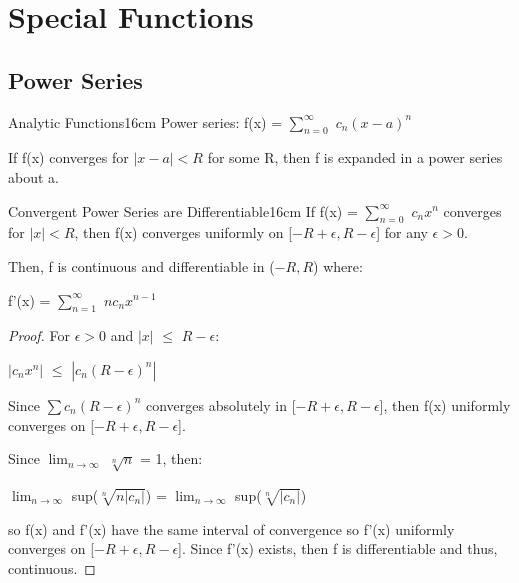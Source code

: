 \newpage

\section[Day 15: Special Functions]{ Special Functions }

\subsection{ Power Series }

    \begin{definition}{Analytic Functions}{16cm}
        Power series: f(x) = $\sum_{n=0}^{\infty}$ $c_n(x-a)^n$

        If f(x) converges for $|x-a| < R$
        for some R, then f is expanded in a power series about a.
    \end{definition}

    \vspace{0.5cm}



    \begin{wtheorem}{Convergent Power Series are Differentiable}{16cm}
        If f(x) = $\sum_{n=0}^{\infty}$ $c_nx^n$ converges for $|x| < R$, then
        f(x) converges uniformly on [$-R+\epsilon,R-\epsilon$] for any
        $\epsilon > 0$.

        Then, f is continuous and differentiable in ($-R,R$) where:

        \hspace{0.5cm}
        f'(x) = $\sum_{n=1}^{\infty}$ $nc_nx^{n-1}$
    \end{wtheorem}

    \begin{proof}
        For $\epsilon > 0$ and $|x|$ $\leq$ $R - \epsilon$:

        \hspace{0.5cm}
        $|c_nx^n|$ $\leq$ $|c_n(R-\epsilon)^n|$

        Since $\sum c_n(R-\epsilon)^n$ converges absolutely in
        [$-R+\epsilon,R-\epsilon$], then f(x) uniformly converges on
        [$-R+\epsilon,R-\epsilon$].
        
        Since $\lim_{n \rightarrow \infty}$ $\sqrt[n]{n}$ = 1, then:

        \hspace{0.5cm}
        $\lim_{n \rightarrow \infty}$ sup($\sqrt[n]{n|c_n|}$)
        = $\lim_{n \rightarrow \infty}$ sup($\sqrt[n]{|c_n|}$)
        
        so f(x) and f'(x) have the same interval of convergence
        so f'(x) uniformly converges on [$-R+\epsilon,R-\epsilon$].
        Since f'(x) exists, then f
        is differentiable and thus, continuous. 
    \end{proof}

